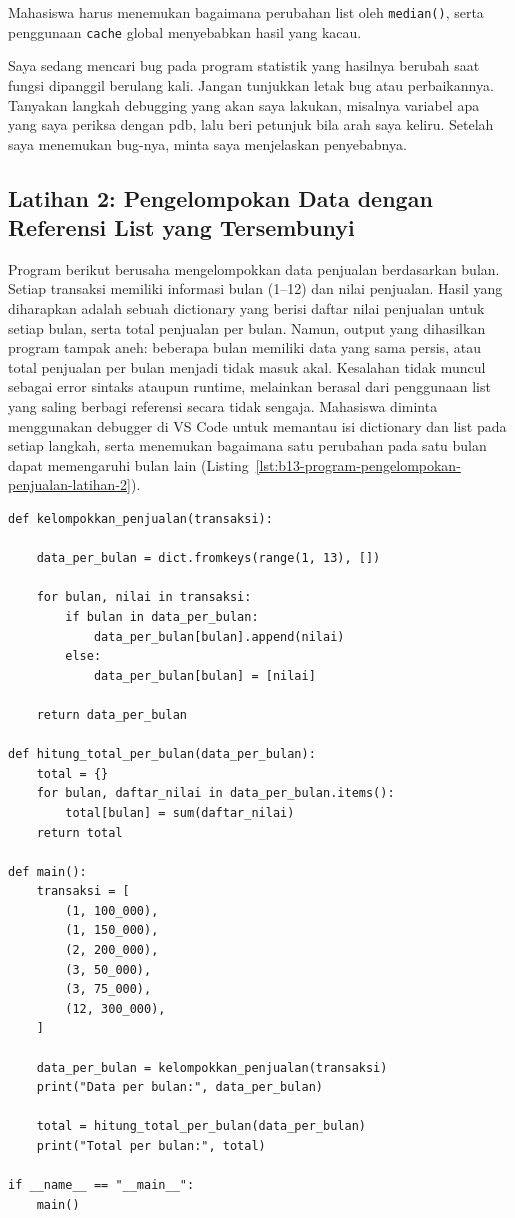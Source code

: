 Mahasiswa harus menemukan bagaimana perubahan list oleh \texttt{median()}, serta penggunaan \texttt{cache} global menyebabkan hasil yang kacau.

\begin{promptterarah}
Saya sedang mencari bug pada program statistik yang hasilnya berubah saat fungsi dipanggil berulang kali. Jangan tunjukkan letak bug atau perbaikannya. Tanyakan langkah debugging yang akan saya lakukan, misalnya variabel apa yang saya periksa dengan pdb, lalu beri petunjuk bila arah saya keliru. Setelah saya menemukan bug-nya, minta saya menjelaskan penyebabnya.
\end{promptterarah}


\subsection*{Latihan 2: Pengelompokan Data dengan Referensi List yang Tersembunyi}

Program berikut berusaha mengelompokkan data penjualan berdasarkan bulan. Setiap transaksi memiliki informasi bulan (1--12) dan nilai penjualan. Hasil yang diharapkan adalah sebuah dictionary yang berisi daftar nilai penjualan untuk setiap bulan, serta total penjualan per bulan. Namun, output yang dihasilkan program tampak aneh: beberapa bulan memiliki data yang sama persis, atau total penjualan per bulan menjadi tidak masuk akal. Kesalahan tidak muncul sebagai error sintaks ataupun runtime, melainkan berasal dari penggunaan list yang saling berbagi referensi secara tidak sengaja. Mahasiswa diminta menggunakan debugger di VS Code untuk memantau isi dictionary dan list pada setiap langkah, serta menemukan bagaimana satu perubahan pada satu bulan dapat memengaruhi bulan lain (Listing~\ref{lst:b13-program-pengelompokan-penjualan-latihan-2}).

\begin{lstlisting}[style=PythonStyle, caption={Program pengelompokan penjualan untuk Latihan 2}, label={lst:b13-program-pengelompokan-penjualan-latihan-2}]
def kelompokkan_penjualan(transaksi):

    data_per_bulan = dict.fromkeys(range(1, 13), [])

    for bulan, nilai in transaksi:
        if bulan in data_per_bulan:
            data_per_bulan[bulan].append(nilai)
        else:
            data_per_bulan[bulan] = [nilai]

    return data_per_bulan

def hitung_total_per_bulan(data_per_bulan):
    total = {}
    for bulan, daftar_nilai in data_per_bulan.items():
        total[bulan] = sum(daftar_nilai)
    return total

def main():
    transaksi = [
        (1, 100_000),
        (1, 150_000),
        (2, 200_000),
        (3, 50_000),
        (3, 75_000),
        (12, 300_000),
    ]

    data_per_bulan = kelompokkan_penjualan(transaksi)
    print("Data per bulan:", data_per_bulan)

    total = hitung_total_per_bulan(data_per_bulan)
    print("Total per bulan:", total)

if __name__ == "__main__":
    main()
\end{lstlisting}

